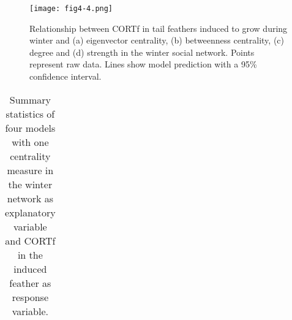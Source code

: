 \documentclass[10pt, twoside]{book} %
\begin{document}
\clearpage
\begin{figure}[h!]
	\begin{center}
		\texttt{[image: fig4-4.png]}
	\end{center}
	\caption{Relationship between CORTf in tail feathers induced to grow during winter and (a) eigenvector centrality, (b) betweenness centrality, (c) degree and (d) strength in the winter social network. Points represent raw data. Lines show model prediction with a 95\% confidence interval.}\label{fig4-4}
\end{figure}


\clearpage	
\begin{table}[h!]
	\begin{center}
		\begin{footnotesize}
			\caption{Summary statistics of four models with one centrality measure in the winter network as explanatory variable and CORTf in the induced feather as response variable.} \label{tab4-2} 
			
			\begingroup
			\setlength{\tabcolsep}{8pt} %
			\renewcommand{\arraystretch}{1.5} %
			\begin{tabular}{p{2cm} l r r r }
				

\end{tabular}
\end{footnotesize}
\end{center}
\end{table}
\end{document}
